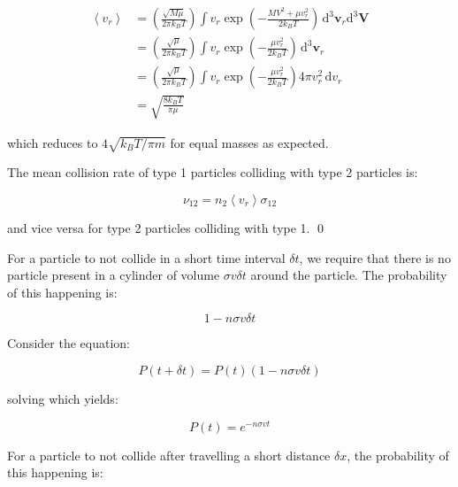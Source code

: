 \documentclass[12pt]{article}
\begin{document}
\begin{equation}
\begin{split}
    \left\langle v_{r} \right\rangle &= \left( \frac{\sqrt{M\mu}}{2\pi k_{B}T} \right) \int v_{r} \exp\left( -\frac{MV^{2} + \mu v_{r}^{2}}{2k_{B}T} \right) \, \mathrm{d}^{3} \mathbf{v}_{r} \mathrm{d}^{3} \mathbf{V} \\
    &= \left( \frac{\sqrt{\mu}}{2\pi k_{B}T} \right) \int v_{r} \exp\left( -\frac{\mu v_{r}^{2}}{2k_{B}T} \right) \, \mathrm{d}^{3} \mathbf{v}_{r} \\
    &= \left( \frac{\sqrt{\mu}}{2\pi k_{B}T} \right) \int v_{r} \exp\left( -\frac{\mu v_{r}^{2}}{2k_{B}T} \right) 4\pi v_{r}^{2} \, \mathrm{d}v_{r} \\
    &= \sqrt{\frac{8k_{B}T}{\pi \mu}}
\end{split}
\end{equation}

which reduces to $4\sqrt{k_{B}T/\pi m}$ for equal masses as expected.

The mean collision rate of type 1 particles colliding with type 2 particles is:

\begin{equation}
    \nu_{12} = n_{2} \left\langle v_{r} \right\rangle \sigma_{12}
\end{equation}

and vice versa for type 2 particles colliding with type 1.
\qed



For a particle to not collide in a short time interval $\delta t$, we require that there is no particle present in a cylinder of volume $\sigma v \delta t$ around the particle. The probability of this happening is:

\begin{equation}
    1 - n \sigma v \delta t
\end{equation}

Consider the equation:

\begin{equation}
    P(t + \delta t) = P(t) \left( 1 - n \sigma v \delta t \right)
\end{equation}

solving which yields:

\begin{equation}
    P(t) = e^{-n \sigma v t}
\end{equation}

For a particle to not collide after travelling a short distance $\delta x$, the probability of this happening is:
\end{document}
